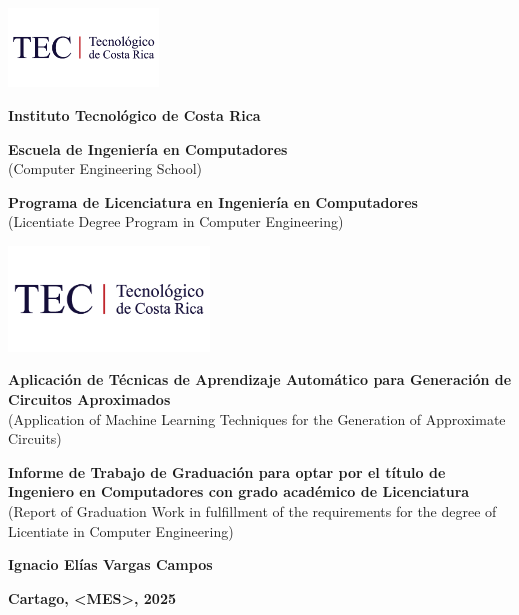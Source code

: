 \begin{titlepage}
  \raggedright
  \addtolength{\topmargin}{-1cm}
  \includegraphics[width = 40mm]{imágenes/logo tec.png}

  \begin{center}
    \vspace*{1cm}

    {\large\textbf{Instituto Tecnológico de Costa Rica}}

    \vspace{0.3cm}

    {\large\textbf{Escuela de Ingeniería en Computadores}}\\
    {\small{(Computer Engineering School)}}

    \vspace{0.3cm}

    {\large\textbf{Programa de Licenciatura en Ingeniería en Computadores}}\\
    {\small{(Licentiate Degree Program in Computer Engineering)}}

    \vspace{0.5cm}

    \includegraphics[width=0.4\textwidth]{imágenes/logo tec.png}
    \vspace{1cm}

    {\large\textbf{Aplicación de Técnicas de Aprendizaje Automático para Generación de Circuitos Aproximados
    }}\\
    {\small{(Application of Machine Learning Techniques for the Generation of Approximate Circuits)}}

    \vspace{2cm}

    {\large\textbf{Informe de Trabajo de Graduación para optar por el título de Ingeniero en Computadores con grado académico de Licenciatura}}\\
    {\small{(Report of Graduation Work in fulfillment of the requirements for the degree of Licentiate in Computer Engineering)}}

    \vspace{3cm}

    {\large\textbf{Ignacio Elías Vargas Campos}}

    \vfill

    {\large\textbf{
        Cartago, <MES>, 2025
    }}
  \end{center}
\end{titlepage}
